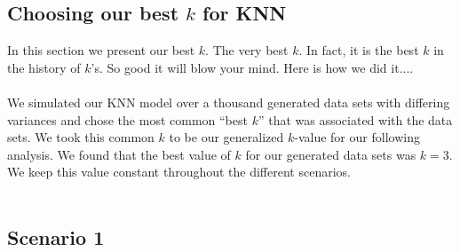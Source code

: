 \documentclass[11pt, oneside]{article}
\begin{document}
\subsection*{Choosing our best $k$ for KNN}
In this section we present our best $k$. The very best $k$. In fact, it is the best $k$ in the history of $k$'s. So good it will blow your mind. Here is how we did it....\\
\\
We simulated our KNN model over a thousand generated data sets with differing variances and chose the most common ``best $k$'' that was associated with the data sets. We took this common $k$ to be our generalized $k$-value for our following analysis. We found that the best value of $k$ for our generated data sets was $k = 3$. We keep this value constant throughout the different scenarios.\\
\\

\pagebreak

\subsection*{Scenario 1}
\end{document}
